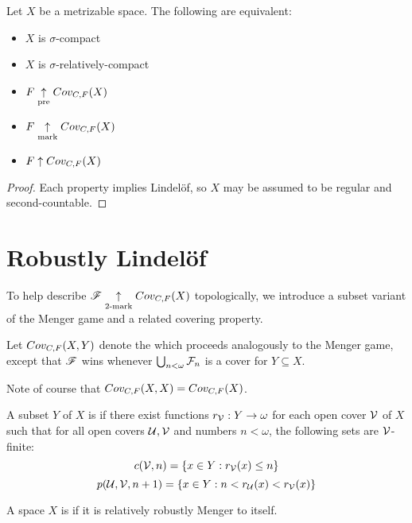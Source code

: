 \begin{cor}
  Let $X$ be a metrizable space. The following are equivalent:
  \begin{itemize}
    \item $X$ is $\sigma$-compact
    \item $X$ is $\sigma$-relatively-compact
    \item $F \underset{\text{pre}}{\uparrow} Cov_{C,F}(X)$
    \item $F \underset{\text{mark}}{\uparrow} Cov_{C,F}(X)$
    \item $F \uparrow Cov_{C,F}(X)$
  \end{itemize}
\end{cor}

\begin{proof}
  Each property implies Lindel\"of, so $X$ may be assumed to be
  regular and second-countable.
\end{proof}



\section{Robustly Lindel\"of}

To help describe $\mathscr{F}\underset{2\text{-mark}}{\uparrow}Cov_{C,F}(X)$ topologically, we introduce a
subset variant of the Menger game and a related covering property.

\begin{game}
  Let $Cov_{C,F}(X,Y)$ denote the  which proceeds
  analogously to the Menger game, except that $\mathscr{F}$ wins whenever
  $\bigcup_{n<\omega} \mathcal{F}_n$ is a cover for $Y\subseteq X$.
\end{game}

Note of course that $Cov_{C,F}(X,X)=Cov_{C,F}(X)$.

\begin{defn}
  A subset $Y$ of $X$ is  if there exist
  functions $r_{\mathcal{V}}:Y\to\omega$
  for each open cover $\mathcal{V}$ of $X$ such that
  for all open covers $\mathcal{U},\mathcal{V}$ and numbers $n<\omega$,
  the following sets are $\mathcal{V}$-finite:
    \[
      c(\mathcal{V},n)=\{ x\in Y : r_{\mathcal{V}}(x)\leq n\}
    \]
    \[
      p(\mathcal{U},\mathcal{V},n+1)=\{ x\in Y : n<r_{\mathcal{U}}(x)<r_{\mathcal{V}}(x)\}
    \]
\end{defn}

\begin{defn}
  A space $X$ is  if it is relatively robustly
  Menger to itself.
\end{defn}

